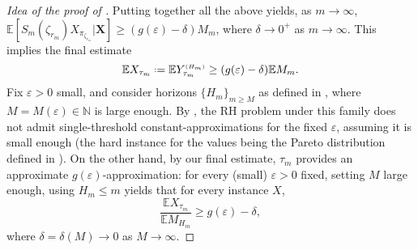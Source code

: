 \documentclass[11pt, a4paper, twoside]{article}
\newcommand*{\defeq}{\mathrel{\vcenter{\baselineskip0.5ex \lineskiplimit0pt
			\hbox{\scriptsize.}\hbox{\scriptsize.}}}=}
\newcommand{\ssup}[1]{{\scriptscriptstyle{({#1})}}}
\newcommand{\eps}{\varepsilon}
\newcommand{\NN}{\mathbb{N}}
\newcommand{\EE}{\mathbb{E}}
\newcommand{\XX}{\mathbf{X}}
\numberwithin{equation}{section}
\begin{document}
\begin{proof}[Idea of the proof of ]
		Putting together all the above yields, as $m\longrightarrow\infty$, $\EE[S_m(\zeta_{r_m})X_{\pi_{\zeta_{r_m}}}|\XX]\ge (g(\eps)-\delta)M_m$, where $\delta\longrightarrow 0^+$ as $m\longrightarrow\infty$. This implies the final estimate \[\EE X_{\tau_m}\defeq\EE Y_{\tau_m}^\ssup{H_m}\ge (g(\eps)-\delta)\EE M_m.\] Fix $\eps>0$ small, and consider horizons $\{H_m\}_{m\ge M}$ as defined in , where $M=M(\eps)\in\NN$ is large enough. By , the RH problem under this family does not admit single-threshold constant-approximations for the fixed $\eps$, assuming it is small enough (the hard instance for the values being the Pareto distribution defined in ). On the other hand, by our final estimate, $\tau_m$ provides an approximate $g(\eps)$-approximation: for every (small) $\eps>0$ fixed, setting $M$ large enough, using $H_m\le m$ yields that for every instance $X$,
		\[\frac{\EE X_{\tau_m}}{\EE M_{H_m}}\ge g(\eps)-\delta,\]
		where $\delta=\delta(M)\longrightarrow 0$ as $M\longrightarrow\infty$.
	\end{proof}
	
\end{document}
